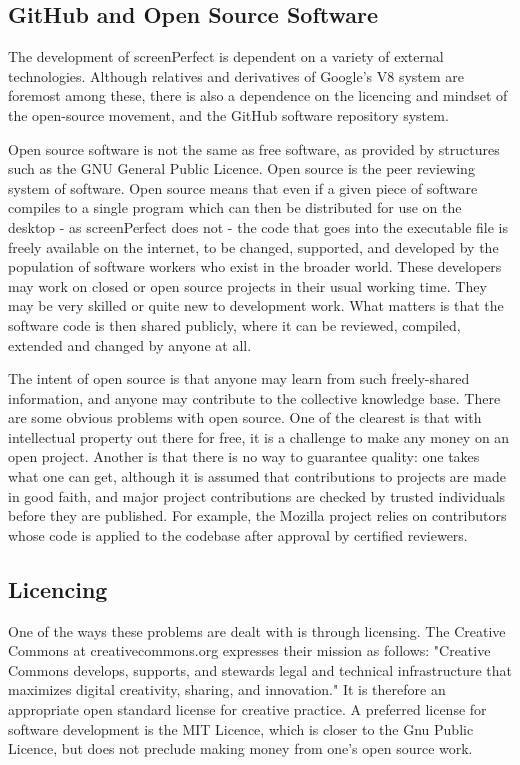 \subsection{GitHub and Open Source Software}
The development of screenPerfect is dependent on a variety of external technologies. Although relatives and derivatives of Google's V8 system are foremost among these, there is also a dependence on the licencing and mindset of the open-source movement, and the GitHub software repository system.

Open source software is not the same as free software, as provided by structures such as the GNU General Public Licence. Open source is the peer reviewing system of software. Open source means that even if a given piece of software compiles to a single program which can then be distributed for use on the desktop - as screenPerfect does not - the code that goes into the executable file is freely available on the internet, to be changed, supported, and developed by the population of software workers who exist in the broader world. These developers may work on closed or open source projects in their usual working time. They may be very skilled or quite new to development work. What matters is that the software code is then shared publicly, where it can be reviewed, compiled, extended and changed by anyone at all.

The intent of open source is that anyone may learn from such freely-shared information, and anyone may contribute to the collective knowledge base. There are some obvious problems with open source. One of the clearest is that with intellectual property out there for free, it is a challenge to make any money on an open project. Another is that there is no way to guarantee quality: one takes what one can get, although it is assumed that contributions to projects are made in good faith, and major project contributions are checked by trusted individuals before they are published. For example, the Mozilla project relies on contributors whose code is applied to the codebase after approval by certified reviewers.

\subsection{Licencing}
One of the ways these problems are dealt with is through licensing. The Creative Commons at creativecommons.org expresses their mission as follows: "Creative Commons develops, supports, and stewards legal and technical infrastructure that maximizes digital creativity, sharing, and innovation." It is therefore an appropriate open standard license for creative practice. A preferred license for software development is the MIT Licence, which is closer to the Gnu Public Licence, but does not preclude making money from one's open source work. 

